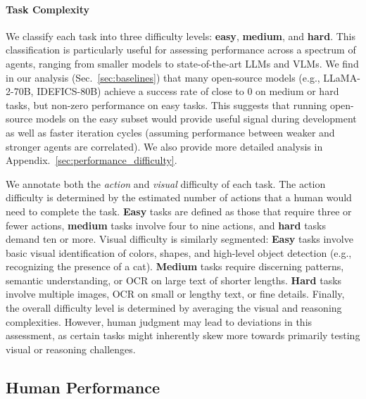 \paragraph{Task Complexity}

We classify each task into three difficulty levels: \textbf{easy}, \textbf{medium}, and \textbf{hard}. This classification is particularly useful for assessing performance across a spectrum of agents, ranging from smaller models to state-of-the-art LLMs and VLMs. We find in our analysis (Sec.~\ref{sec:baselines}) that many open-source models (e.g., LLaMA-2-70B, IDEFICS-80B) achieve a success rate of close to 0 on medium or hard tasks, but non-zero performance on easy tasks. This suggests that running open-source models on the easy subset would provide useful signal during development as well as faster iteration cycles (assuming performance between weaker and stronger agents are correlated). We also provide more detailed analysis in Appendix.~\ref{sec:performance_difficulty}.

We annotate both the \textit{action} and \textit{visual} difficulty of each task. %
The action difficulty is determined by the estimated number of actions that a human would need to complete the task. \textbf{Easy} tasks are defined as those that require three or fewer actions, \textbf{medium} tasks involve four to nine actions, and \textbf{hard} tasks demand ten or more. 
Visual difficulty is similarly segmented: %
\textbf{Easy} tasks involve basic visual identification of colors, shapes, and high-level object detection (e.g., recognizing the presence of a cat). 
\textbf{Medium} tasks require discerning patterns, semantic understanding, or OCR on large text of shorter lengths. 
\textbf{Hard} tasks involve multiple images, OCR on small or lengthy text, or fine details. %
Finally, the overall difficulty level is determined by averaging the visual and reasoning complexities. However, human judgment may lead to deviations in this assessment, as certain tasks might inherently skew more towards primarily testing visual or reasoning challenges.


\subsection{Human Performance}

